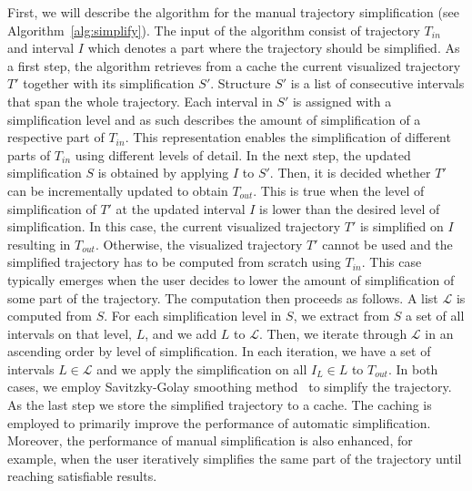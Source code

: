 First, we will describe the algorithm for the manual trajectory simplification (see Algorithm~\ref{alg:simplify}).
The input of the algorithm consist of trajectory $T_{in}$ and interval $I$ which denotes a part where the trajectory should be simplified.
As a first step, the algorithm retrieves from a cache the current visualized trajectory $T'$ together with its simplification $S'$.
Structure $S'$ is a list of consecutive intervals that span the whole trajectory.
Each interval in $S'$ is assigned with a simplification level and as such describes the amount of simplification of a respective part of $T_{in}$.
This representation enables the simplification of different parts of $T_{in}$ using different levels of detail.
In the next step, the updated simplification $S$ is obtained by applying $I$ to $S'$.
Then, it is decided whether $T'$ can be incrementally updated to obtain $T_{out}$.
This is true when the level of simplification of $T'$ at the updated interval $I$ is lower than the desired level of simplification.
In this case, the current visualized trajectory $T'$ is simplified on $I$ resulting in $T_{out}$.
Otherwise, the visualized trajectory $T'$ cannot be used and the simplified trajectory has to be computed from scratch using $T_{in}$.
This case typically emerges when the user decides to lower the amount of simplification of some part of the trajectory.
The computation then proceeds as follows.
A list $\mathcal{L}$ is computed from $S$.
For each simplification level in $S$, we extract from $S$ a set of all intervals on that level, $L$, and we add $L$ to $\mathcal{L}$.
Then, we iterate through $\mathcal{L}$ in an ascending order by level of simplification.
In each iteration, we have a set of intervals $L \in \mathcal{L}$ and we apply the simplification on all $I_L \in L$ to $T_{out}$.
In both cases, we employ Savitzky-Golay smoothing method~\cite{savitzky1964smoothing} to simplify the trajectory.
As the last step we store the simplified trajectory to a cache.
The caching is employed to primarily improve the performance of automatic simplification.
Moreover, the performance of manual simplification is also enhanced, for example, when the user iteratively simplifies the same part of the trajectory until reaching satisfiable results.

